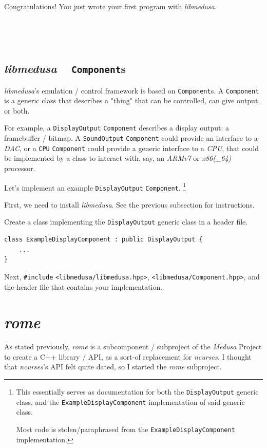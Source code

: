 \documentclass{report}
\newcommand{\Medusa}{\textit{Medusa}\xspace}
\begin{document}
	Congratulations! You just wrote your first program with \textit{libmedusa}.
	\
	
	\

	\

	\subsection{\textit{libmedusa} ~ \texttt{Component}s}
	\textit{libmedusa}'s emulation / control framework is based on
	\texttt{Component}s. A \texttt{Component} is a generic class that describes
	a "thing" that can be controlled, can give output, or both.

	For example, a \texttt{DisplayOutput} \texttt{Component} describes a display
	output: a framebuffer / bitmap. A \texttt{SoundOutput} \texttt{Component}
	could provide an interface to a \textit{DAC}, or a \texttt{CPU}
	\texttt{Component} could provide a generic interface to a \textit{CPU}, that
	could be implemented by a class to interact with, say, an \textit{ARMv7} or
	\textit{x86(\_64)} processor.

	Let's implement an example \texttt{DisplayOutput} \texttt{Component}.
	\footnote{
		\label{ExampleDisplayComponent1}
		This essentially serves as documentation for both the
		\texttt{DisplayOutput} generic class, and the
		\texttt{ExampleDisplayComponent} implementation of said generic class.

		Most code is stolen/paraphrased from the
		\texttt{ExampleDisplayComponent} implementation.
	}

	First, we need to install \textit{libmedusa}. See the previous subsection
	for instructions.

	Create a class implementing the \texttt{DisplayOutput} generic class in a
	header file.

	\begin{lstlisting}
class ExampleDisplayComponent : public DisplayOutput {
	...
}
	\end{lstlisting}

	Next, \texttt{\#include} \texttt{<libmedusa/libmedusa.hpp>},
	\texttt{<libmedusa/Component.hpp>}, and the header file that contains your
	implementation.

	\section{\textit{rome}}
	As stated previously, \textit{rome} is a subcomponent / subproject of the
	\Medusa Project to create a C++ library / API, as a sort-of replacement for
	\textit{ncurses}. I thought that \textit{ncurses}'s API felt quite dated, so
	I started the \textit{rome} subproject.
\end{document}
